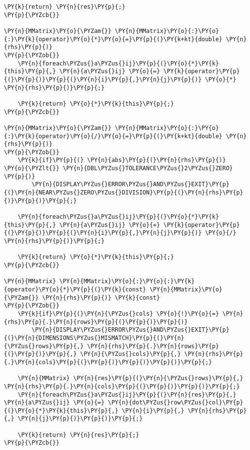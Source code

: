 \begin{Verbatim}[commandchars=\\\{\}]
	\PY{k}{return} \PY{n}{res}\PY{p}{;}
\PY{p}{\PYZcb{}}

\PY{n}{MMatrix}\PY{o}{\PYZam{}} \PY{n}{MMatrix}\PY{o}{:}\PY{o}{:}\PY{k}{operator}\PY{o}{*}\PY{o}{=}\PY{p}{(}\PY{k+kt}{double} \PY{n}{rhs}\PY{p}{)}
\PY{p}{\PYZob{}}
	\PY{n}{foreach\PYZus{}a\PYZus{}ij}\PY{p}{(}\PY{o}{*}\PY{k}{this}\PY{p}{,} \PY{n}{a\PYZus{}ij} \PY{o}{=} \PY{k}{operator}\PY{p}{(}\PY{p}{)}\PY{p}{(}\PY{n}{i}\PY{p}{,}\PY{n}{j}\PY{p}{)} \PY{o}{*} \PY{n}{rhs}\PY{p}{)}\PY{p}{;}

	\PY{k}{return} \PY{o}{*}\PY{k}{this}\PY{p}{;}
\PY{p}{\PYZcb{}}

\PY{n}{MMatrix}\PY{o}{\PYZam{}} \PY{n}{MMatrix}\PY{o}{:}\PY{o}{:}\PY{k}{operator}\PY{o}{/}\PY{o}{=}\PY{p}{(}\PY{k+kt}{double} \PY{n}{rhs}\PY{p}{)}
\PY{p}{\PYZob{}}
	\PY{k}{if}\PY{p}{(} \PY{n}{abs}\PY{p}{(}\PY{n}{rhs}\PY{p}{)} \PY{o}{\PYZlt{}} \PY{n}{DBL\PYZus{}TOLERANCE\PYZus{}2\PYZus{}ZERO} \PY{p}{)}
		\PY{n}{DISPLAY\PYZus{}ERROR\PYZus{}AND\PYZus{}EXIT}\PY{p}{(}\PY{n}{NEAR\PYZus{}ZERO\PYZus{}DIVISION}\PY{p}{(}\PY{n}{rhs}\PY{p}{)}\PY{p}{)}\PY{p}{;}

	\PY{n}{foreach\PYZus{}a\PYZus{}ij}\PY{p}{(}\PY{o}{*}\PY{k}{this}\PY{p}{,} \PY{n}{a\PYZus{}ij} \PY{o}{=} \PY{k}{operator}\PY{p}{(}\PY{p}{)}\PY{p}{(}\PY{n}{i}\PY{p}{,}\PY{n}{j}\PY{p}{)} \PY{o}{/} \PY{n}{rhs}\PY{p}{)}\PY{p}{;}

	\PY{k}{return} \PY{o}{*}\PY{k}{this}\PY{p}{;}
\PY{p}{\PYZcb{}}

\PY{n}{MMatrix} \PY{n}{MMatrix}\PY{o}{:}\PY{o}{:}\PY{k}{operator}\PY{o}{*}\PY{p}{(}\PY{k}{const} \PY{n}{MMatrix}\PY{o}{\PYZam{}} \PY{n}{rhs}\PY{p}{)} \PY{k}{const}
\PY{p}{\PYZob{}}
	\PY{k}{if}\PY{p}{(}\PY{n}{\PYZus{}cols} \PY{o}{!}\PY{o}{=} \PY{n}{rhs}\PY{p}{.}\PY{n}{rows}\PY{p}{(}\PY{p}{)}\PY{p}{)}
		\PY{n}{DISPLAY\PYZus{}ERROR\PYZus{}AND\PYZus{}EXIT}\PY{p}{(}\PY{n}{DIMENSIONS\PYZus{}MISMATCH}\PY{p}{(}\PY{n}{\PYZus{}rows}\PY{p}{,} \PY{n}{rhs}\PY{p}{.}\PY{n}{rows}\PY{p}{(}\PY{p}{)}\PY{p}{,} \PY{n}{\PYZus{}cols}\PY{p}{,} \PY{n}{rhs}\PY{p}{.}\PY{n}{cols}\PY{p}{(}\PY{p}{)}\PY{p}{)}\PY{p}{)}\PY{p}{;}

	\PY{n}{MMatrix} \PY{n}{res}\PY{p}{(}\PY{n}{\PYZus{}rows}\PY{p}{,} \PY{n}{rhs}\PY{p}{.}\PY{n}{cols}\PY{p}{(}\PY{p}{)}\PY{p}{)}\PY{p}{;}
	\PY{n}{foreach\PYZus{}a\PYZus{}ij}\PY{p}{(}\PY{n}{res}\PY{p}{,} \PY{n}{a\PYZus{}ij} \PY{o}{=} \PY{n}{dot\PYZus{}row\PYZus{}col}\PY{p}{(}\PY{o}{*}\PY{k}{this}\PY{p}{,} \PY{n}{i}\PY{p}{,} \PY{n}{rhs}\PY{p}{,} \PY{n}{j}\PY{p}{)}\PY{p}{)}\PY{p}{;}

	\PY{k}{return} \PY{n}{res}\PY{p}{;}
\PY{p}{\PYZcb{}}


\end{Verbatim}
